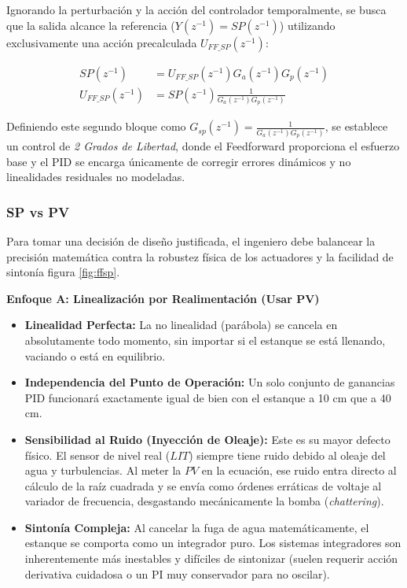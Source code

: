 Ignorando la perturbación y la acción del controlador temporalmente, se busca que la salida alcance la referencia ($Y(z^{-1}) = SP(z^{-1})$) utilizando exclusivamente una acción precalculada $U_{FF\_SP}(z^{-1})$:

\begin{align}
    SP(z^{-1}) &= U_{FF\_SP}(z^{-1}) G_a(z^{-1}) G_p(z^{-1}) \\
    U_{FF\_SP}(z^{-1}) &= SP(z^{-1}) \frac{1}{G_a(z^{-1}) G_p(z^{-1})}
\end{align}

Definiendo este segundo bloque como $G_{sp}(z^{-1}) = \frac{1}{G_a(z^{-1}) G_p(z^{-1})}$, se establece un control de \textit{2 Grados de Libertad}, donde el Feedforward proporciona el esfuerzo base y el PID se encarga únicamente de corregir errores dinámicos y no linealidades residuales no modeladas.
\subsubsection{SP vs PV}

Para tomar una decisión de diseño justificada, el ingeniero debe balancear la precisión matemática contra la robustez física de los actuadores y la facilidad de sintonía figura \ref{fig:ffsp}.

\vspace{3mm}
\noindent\textbf{Enfoque A: Linealización por Realimentación (Usar PV)}
\begin{itemize}
    \item[\textcolor{green!60!black}{\textbf{+}}] \textbf{Linealidad Perfecta:} La no linealidad (parábola) se cancela en absolutamente todo momento, sin importar si el estanque se está llenando, vaciando o está en equilibrio.
    \item[\textcolor{green!60!black}{\textbf{+}}] \textbf{Independencia del Punto de Operación:} Un solo conjunto de ganancias PID funcionará exactamente igual de bien con el estanque a 10 cm que a 40 cm.
    \item[\textcolor{red}{\textbf{--}}] \textbf{Sensibilidad al Ruido (Inyección de Oleaje):} Este es su mayor defecto físico. El sensor de nivel real ($LIT$) siempre tiene ruido debido al oleaje del agua y turbulencias. Al meter la $PV$ en la ecuación, ese ruido entra directo al cálculo de la raíz cuadrada y se envía como órdenes erráticas de voltaje al variador de frecuencia, desgastando mecánicamente la bomba (\textit{chattering}).
    \item[\textcolor{red}{\textbf{--}}] \textbf{Sintonía Compleja:} Al cancelar la fuga de agua matemáticamente, el estanque se comporta como un integrador puro. Los sistemas integradores son inherentemente más inestables y difíciles de sintonizar (suelen requerir acción derivativa cuidadosa o un PI muy conservador para no oscilar).
\end{itemize}

